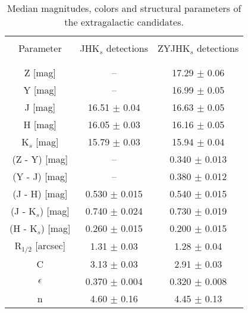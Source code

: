 \documentclass[preprint2]{aastex}
\begin{document}
\begin{table*}
  \centering
  \caption{Median magnitudes, colors and structural parameters of the
    extragalactic candidates. }
      \label{medianas}

    {\small
        \begin{tabular}{c|c|c}
        \hline
        \hline
        & &   \\
Parameter & JHK$_s$ detections & ZYJHK$_s$ detections \\
 & &  \\ 
        \hline                                                          
 & &   \\ 

 Z [mag] &   -- &   17.29 $\pm$ 0.06  \\
 Y [mag] &   -- &   16.99 $\pm$ 0.05  \\
 J [mag] & 16.51 $\pm$ 0.04  & 16.63  $\pm$ 0.05   \\
 H [mag] & 16.05 $\pm$ 0.03  & 16.16  $\pm$ 0.05   \\ 
 K$_s$ [mag] & 15.79 $\pm$ 0.03  & 15.94 $\pm$ 0.04  \\ 
(Z - Y) [mag]    &    --  &  0.340 $\pm$  0.013  \\
(Y - J) [mag]    &    --  &  0.380 $\pm$  0.012  \\
(J - H) [mag]    & 0.530 $\pm$ 0.015  & 0.540 $\pm$ 0.015 \\ 
(J - K$_s$) [mag] & 0.740 $\pm$ 0.024  & 0.730 $\pm$ 0.019  \\ 
(H - K$_s$) [mag] & 0.260 $\pm$ 0.015 & 0.200 $\pm$ 0.015 \\
R$_{1/2}$ [arcsec] & 1.31 $\pm$ 0.03  & 1.28 $\pm$ 0.04  \\
C        & 3.13 $\pm$ 0.03  & 2.91 $\pm$ 0.03  \\ 
$\epsilon$  & 0.370 $\pm$ 0.004  & 0.320 $\pm$ 0.008  \\
n           & 4.60 $\pm$ 0.16  & 4.45 $\pm$ 0.13  \\
        \hline
        \end{tabular}  
    }
\end{table*}


\clearpage
\end{document}
